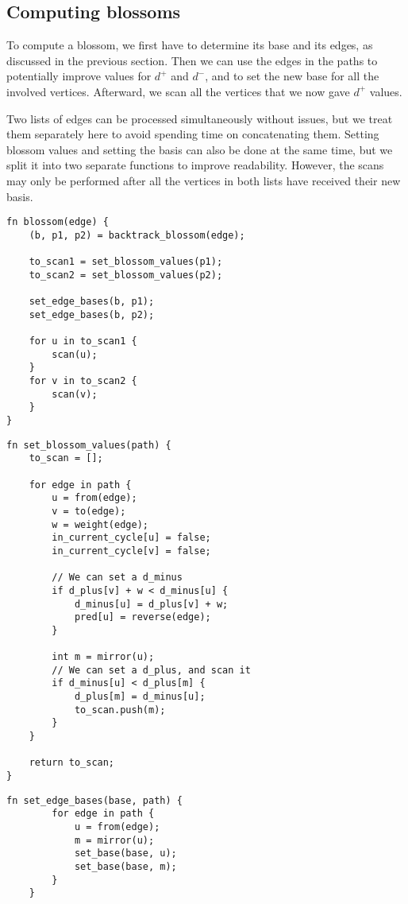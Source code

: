 \subsection{Computing blossoms}
To compute a blossom, we first have to determine its base and its edges, as discussed in the previous section. Then we can use the edges in the paths to potentially improve values for $d^+$ and $d^-$, and to set the new base for all the involved vertices. Afterward, we scan all the vertices that we now gave $d^+$ values.

Two lists of edges can be processed simultaneously without issues, but we treat them separately here to avoid spending time on concatenating them. Setting blossom values and setting the basis can also be done at the same time, but we split it into two separate functions to improve readability. However, the scans may only be performed after all the vertices in both lists have received their new basis.
\begin{lstlisting}[caption={Blossom},label=Listing,mathescape=true]
fn blossom(edge) {
    (b, p1, p2) = backtrack_blossom(edge);

    to_scan1 = set_blossom_values(p1);
    to_scan2 = set_blossom_values(p2);

    set_edge_bases(b, p1);
    set_edge_bases(b, p2);

    for u in to_scan1 {
        scan(u);
    }
    for v in to_scan2 {
        scan(v);
    }
}
\end{lstlisting}

\begin{lstlisting}[caption={Set blossom values},label=Listing,mathescape=true]
fn set_blossom_values(path) {
    to_scan = [];

    for edge in path {
        u = from(edge);
        v = to(edge);
        w = weight(edge);
        in_current_cycle[u] = false;
        in_current_cycle[v] = false;

        // We can set a d_minus
        if d_plus[v] + w < d_minus[u] {
            d_minus[u] = d_plus[v] + w;
            pred[u] = reverse(edge);
        }

        int m = mirror(u);
        // We can set a d_plus, and scan it
        if d_minus[u] < d_plus[m] {
            d_plus[m] = d_minus[u];
            to_scan.push(m);
        }
    }

    return to_scan;
}
\end{lstlisting}

\begin{lstlisting}[caption={Set edge bases},label=Listing,mathescape=true]
    fn set_edge_bases(base, path) {
        for edge in path {
            u = from(edge);
            m = mirror(u);
            set_base(base, u);
            set_base(base, m);
        }
    }
    \end{lstlisting}

